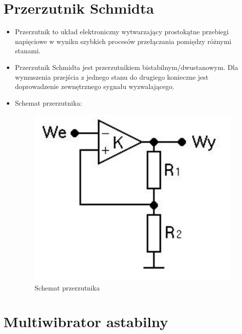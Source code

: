 \section{Przerzutnik Schmidta}

\begin{itemize}
    \item Przerzutnik to układ elektroniczny wytwarzający prostokątne przebiegi napięciowe w wyniku szybkich procesów przełączania pomiędzy różnymi stanami.
    \item Przerzutnik Schmidta jest przerzutnikiem bistabilnym/dwustanowym. Dla wymuszenia przejścia z jednego stanu do drugiego konieczne jest doprowadzenie zewnętrznego sygnału wyzwalającego.
    \item Schemat przerzutnika:
        \begin{figure}[H]
            \centering
            \includegraphics[scale=0.4]{img/schemes/przerzutnik_schmidta.png}
            \caption{Schemat przerzutnika}
            \label{fig:schemat_przerzutnika_schmidta}
        \end{figure}
\end{itemize}

\section{Multiwibrator astabilny}


